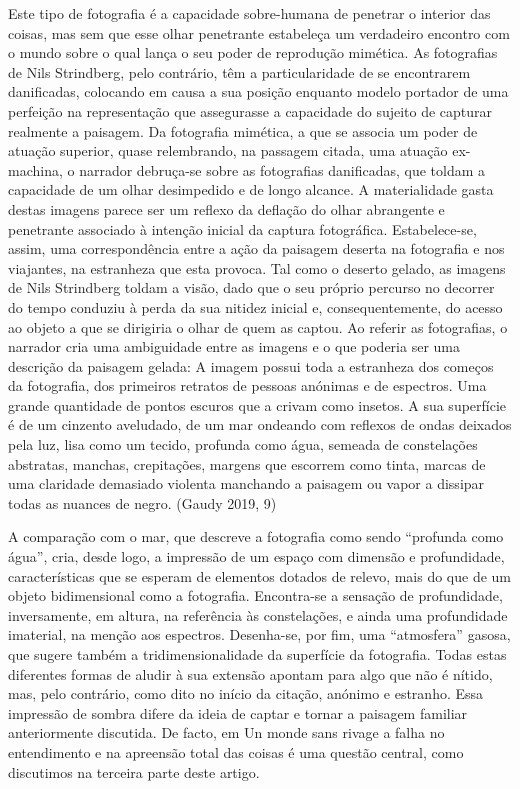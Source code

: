 \documentclass{article}
\begin{document}
Este tipo de fotografia é a capacidade sobre-humana de penetrar o interior das coisas,
mas sem que esse olhar penetrante estabeleça um verdadeiro encontro com o mundo
sobre o qual lança o seu poder de reprodução mimética. As fotografias de Nils
Strindberg, pelo contrário, têm a particularidade de se encontrarem danificadas, colocando em causa a sua posição enquanto modelo portador de uma perfeição na representação que assegurasse a capacidade do sujeito de capturar realmente a paisagem. Da fotografia mimética, a que se associa um poder de atuação superior, quase
relembrando, na passagem citada, uma atuação ex-machina, o narrador debruça-se
sobre as fotografias danificadas, que toldam a capacidade de um olhar desimpedido
e de longo alcance. A materialidade gasta destas imagens parece ser um reflexo da
deflação do olhar abrangente e penetrante associado à intenção inicial da captura
fotográfica. Estabelece-se, assim, uma correspondência entre a ação da paisagem deserta na fotografia e nos viajantes, na estranheza que esta provoca. Tal como o deserto gelado, as imagens de Nils Strindberg toldam a visão, dado que o seu próprio
percurso no decorrer do tempo conduziu à perda da sua nitidez inicial e, consequentemente, do acesso ao objeto a que se dirigiria o olhar de quem as captou. Ao referir
as fotografias, o narrador cria uma ambiguidade entre as imagens e o que poderia
ser uma descrição da paisagem gelada:
A imagem possui toda a estranheza dos começos da fotografia, dos primeiros retratos de pessoas anónimas e de espectros. Uma grande quantidade de pontos
escuros que a crivam como insetos. A sua superfície é de um cinzento aveludado,
de um mar ondeando com reflexos de ondas deixados pela luz, lisa como um tecido, profunda como água, semeada de constelações abstratas, manchas, crepitações, margens que escorrem como tinta, marcas de uma claridade demasiado violenta manchando a paisagem ou vapor a dissipar todas as nuances de negro.
(Gaudy 2019, 9)





A comparação com o mar, que descreve a fotografia como sendo “profunda como
água”, cria, desde logo, a impressão de um espaço com dimensão e profundidade,
características que se esperam de elementos dotados de relevo, mais do que de um
objeto bidimensional como a fotografia. Encontra-se a sensação de profundidade, inversamente, em altura, na referência às constelações, e ainda uma profundidade
imaterial, na menção aos espectros. Desenha-se, por fim, uma “atmosfera” gasosa,
que sugere também a tridimensionalidade da superfície da fotografia. Todas estas
diferentes formas de aludir à sua extensão apontam para algo que não é nítido, mas,
pelo contrário, como dito no início da citação, anónimo e estranho. Essa impressão
de sombra difere da ideia de captar e tornar a paisagem familiar anteriormente discutida. De facto, em Un monde sans rivage a falha no entendimento e na apreensão
total das coisas é uma questão central, como discutimos na terceira parte deste artigo.
\end{document}
